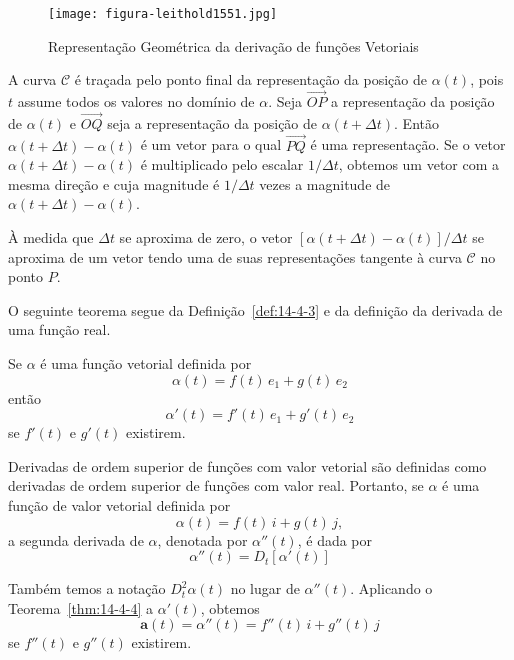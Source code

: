 \begin{figure}[!h]
  \centering
  \texttt{[image: figura-leithold1551.jpg]}
  \caption{Representação Geométrica da derivação de funções Vetoriais}\label{fig:1551}
\end{figure}

A curva \( \mathcal{C}\) é traçada pelo ponto final da representação da posição de \(\alpha(t)\), pois \(t\) assume todos os valores no domínio de \(\alpha\). Seja \(\overrightarrow{OP}\) a representação da posição de \(\alpha(t)\) e \(\overrightarrow{OQ}\) seja a representação da posição de \(\alpha(t+\Delta t)\). Então \(\alpha(t + \Delta t)-\alpha(t)\) é um vetor para o qual \(\overrightarrow{PQ}\) é uma representação. Se o vetor \(\alpha(t + \Delta t)-\alpha(t)\) é multiplicado pelo escalar \(1/\Delta t\), obtemos um vetor com a mesma direção e cuja magnitude é \(1/\Delta t\) vezes a magnitude de \(\alpha(t + \Delta t) - \alpha(t)\).

À medida que \(\Delta t\) se aproxima de zero, o vetor \([\alpha(t + \Delta t)-\alpha(t)]/\Delta t\) se aproxima de um vetor tendo uma de suas representações tangente à curva \( \mathcal{C}\) no ponto \(P\).

O seguinte teorema segue da Definição~\ref{def:14-4-3} e da definição da derivada de uma função real.
\begin{teo}\label{thm:14-4-4}
Se \(\alpha\) é uma função  vetorial definida por
\begin{equation*}
\alpha(t) = f(t)\,e_{1} + g(t)\,e_{2}
\end{equation*}
então
\begin{equation*}
\alpha'(t) = f'(t)\,e_{1} + g'(t)\,e_{2}
\end{equation*}
se \(f'(t)\) e \(g'(t)\) existirem.
\end{teo}

Derivadas de ordem superior de funções com valor vetorial são definidas como derivadas de ordem superior de funções com valor real. Portanto, se \(\alpha\) é uma função de valor vetorial definida por
\begin{equation*}
\alpha(t) = f(t)\,i + g(t)\, j,
\end{equation*}
a segunda derivada de \( \alpha\), denotada por \( \alpha''(t)\), é dada por
\begin{equation*}
\alpha''(t) = D_{t}[\alpha'(t)]
\end{equation*}

Também temos a notação \(D_{t}^{2}\alpha(t)\) no lugar de \(\alpha''(t)\). Aplicando o Teorema~\ref{thm:14-4-4} a \(\alpha'(t)\), obtemos
\begin{equation*}
\mathbf{a}(t)=\alpha''(t) = f''(t)\, i + g''(t)\,j
\end{equation*}
se \(f''(t)\) e \(g''(t)\) existirem.

